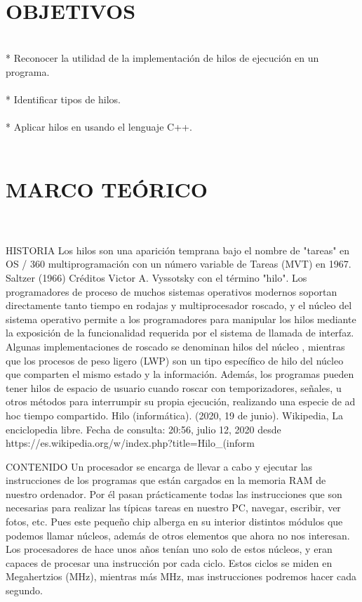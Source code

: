 \documentclass[conference]{IEEEtran}
\begin{document}
\\
\section{OBJETIVOS}
\\
* Reconocer la utilidad de la implementación de hilos de ejecución en un programa.
\\\\
* Identificar tipos de hilos.
\\\\
* Aplicar hilos en usando el lenguaje C++.
\\\\


 

\section{MARCO TEÓRICO}
\\\\

HISTORIA
Los hilos son una aparición temprana bajo el nombre de "tareas" en OS / 360 multiprogramación con un número variable de Tareas (MVT) en 1967. Saltzer (1966) Créditos Victor A. Vyssotsky con el término "hilo". Los programadores de proceso de muchos sistemas operativos modernos soportan directamente tanto tiempo en rodajas y multiprocesador roscado, y el núcleo del sistema operativo permite a los programadores para manipular los hilos mediante la exposición de la funcionalidad requerida por el sistema de llamada de interfaz. Algunas implementaciones de roscado se denominan hilos del núcleo , mientras que los procesos de peso ligero (LWP) son un tipo específico de hilo del núcleo que comparten el mismo estado y la información. Además, los programas pueden tener hilos de espacio de usuario cuando roscar con temporizadores, señales, u otros métodos para interrumpir su propia ejecución, realizando una especie de ad hoc tiempo compartido.
Hilo (informática). (2020, 19 de junio). Wikipedia, La enciclopedia libre. Fecha de consulta: 20:56, julio 12, 2020 desde https://es.wikipedia.org/w/index.php?title=Hilo_(inform%

CONTENIDO
Un procesador se encarga de llevar a cabo y ejecutar las instrucciones de los programas que están cargados en la memoria RAM de nuestro ordenador. Por él pasan prácticamente todas las instrucciones que son necesarias para realizar las típicas tareas en nuestro PC, navegar, escribir, ver fotos, etc.
Pues este pequeño chip alberga en su interior distintos módulos que podemos llamar núcleos, además de otros elementos que ahora no nos interesan. Los procesadores de hace unos años tenían uno solo de estos núcleos, y eran capaces de procesar una instrucción por cada ciclo. Estos ciclos se miden en Megahertzios (MHz), mientras más MHz, mas instrucciones podremos hacer cada segundo.
\end{document}
